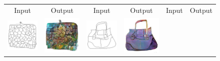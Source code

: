 \begin{figure}%
\begin{center}
\bgroup 
 \def\arraystretch{0.2} 
 \setlength\tabcolsep{0.2pt}
\begin{tabular}{cccccc}
Input & Output & Input & Output & Input & Output \\ 

\includegraphics[width=0.167\linewidth]{figs/handbags_sketches_lotsofresults_latex/input_13223.jpg} &
\includegraphics[width=0.167\linewidth]{figs/handbags_sketches_lotsofresults_latex/L1cGAN_13223.jpg} \hspace{0.025in} &
\includegraphics[width=0.167\linewidth]{figs/handbags_sketches_lotsofresults_latex/input_13252.jpg} &
\includegraphics[width=0.167\linewidth]{figs/handbags_sketches_lotsofresults_latex/L1cGAN_13252.jpg} \hspace{0.025in} &


\end{tabular}
\end{center}
\end{figure}
